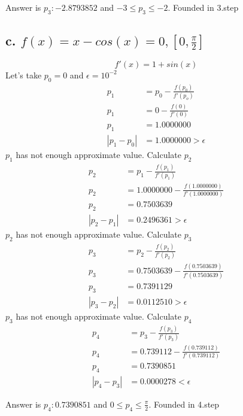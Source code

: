 \documentclass{article}
\begin{document}
Answer is $p_3:-2.8793852$ and $-3\leq p_3 \leq -2$. Founded in 3.step

\subsection{c. $f(x)=x-cos(x) = 0, [0, \frac{\pi}{2}]$}
\begin{equation}
f'(x)=1+sin(x)
\end{equation}
Let's take $p_0=0$ and $\epsilon=10^{-2}$
\begin{align}
\label{2.3.5.c.1}p_1 & = p_0 - \frac{f(p_0)}{f'(p_o)}\\
\label{2.3.5.c.2}p_1 & = 0 - \frac{f(0)}{f'(0)}\\
\label{2.3.5.c.3}p_1 & = 1.0000000\\
\label{2.3.5.c.4}|p_1-p_0| & =1.0000000 > \epsilon
\end{align}
$p_1$ has not enough approximate value. Calculate $p_2$
\begin{align}
\label{2.3.5.c.1}p_2 & = p_1 - \frac{f(p_1)}{f'(p_1)}\\
\label{2.3.5.c.2}p_2 & = 1.0000000 - \frac{f(1.0000000)}{f'(1.0000000)}\\
\label{2.3.5.c.3}p_2 & = 0.7503639\\
\label{2.3.5.c.4}|p_2-p_1| & =0.2496361 > \epsilon
\end{align}
$p_2$ has not enough approximate value. Calculate $p_3$
\begin{align}
\label{2.3.5.c.1}p_3 & = p_2 - \frac{f(p_2)}{f'(p_2)}\\
\label{2.3.5.c.2}p_3 & = 0.7503639 - \frac{f(0.7503639)}{f'(0.7503639)}\\
\label{2.3.5.c.3}p_3 & = 0.7391129\\
\label{2.3.5.c.4}|p_3-p_2| & =0.0112510 > \epsilon
\end{align}
$p_3$ has not enough approximate value. Calculate $p_4$
\begin{align}
\label{2.3.5.c.1}p_4 & = p_3 - \frac{f(p_3)}{f'(p_3)}\\
\label{2.3.5.c.2}p_4 & = 0.739112 - \frac{f(0.739112)}{f'(0.739112)}\\
\label{2.3.5.c.3}p_4 & = 0.7390851\\
\label{2.3.5.c.4}|p_4-p_3| & =0.0000278 < \epsilon
\end{align}

Answer is $p_4:0.7390851$ and $0\leq p_4 \leq \frac{\pi}{2}$. Founded in 4.step\\\\
\end{document}
